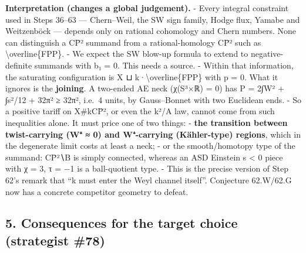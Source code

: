 \documentclass[
  10pt,
]{report}
\begin{document}
\textbf{Interpretation (changes a global judgement).} - Every integral
constraint used in Steps 36--63 --- Chern--Weil, the SW sign family,
Hodge flux, Yamabe and Weitzenböck --- depends only on rational
cohomology and Chern numbers. None can distinguish a CP̄² summand from a
rational-homology CP̄² such as \textbackslash overline\{FPP\}. - We
expect the SW blow-up formula to extend to negative-definite summands
with b₁ = 0. This needs a source. - Within that information, the
saturating configuration is X ⊔ k·\textbackslash overline\{FPP\} with p
= 0. What it ignores is the \textbf{joining}. A two-ended AE neck
(χ(S³×ℝ) = 0) has P = 2∫\textbar W\textbar² + ∫s²/12 + 32π² ≥ 32π²,
i.e.~4 units, by Gauss--Bonnet with two Euclidean ends. - So a positive
tariff on X\#kCP̄², or even the k²/A law, cannot come from such
inequalities alone. It must price one of two things: - \textbf{the
transition between twist-carrying (W⁺ ≈ 0) and W⁺-carrying (Kähler-type)
regions}, which in the degenerate limit costs at least a neck; - or the
smooth/homotopy type of the summand: CP̄²∖B is simply connected, whereas
an ASD Einstein s \textless{} 0 piece with χ = 3, τ = −1 is a
ball-quotient type. - This is the precise version of Step 62's remark
that ``k must enter the Weyl channel itself''. Conjecture 62.W/62.G now
has a concrete competitor geometry to defeat.

\hypertarget{consequences-for-the-target-choice-strategist-78}{%
\subsection{5. Consequences for the target choice (strategist
\#78)}\label{consequences-for-the-target-choice-strategist-78}}
\end{document}
